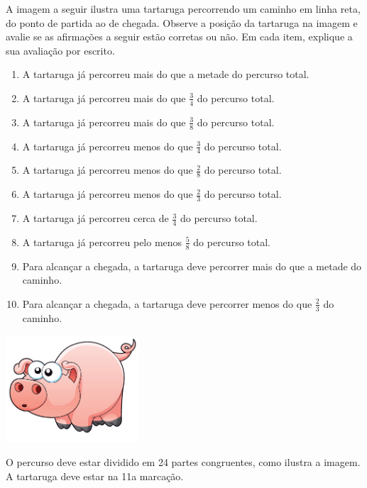 \documentclass[a4,12pt]{book}
\begin{document}
A imagem a seguir ilustra uma tartaruga percorrendo um caminho em linha reta, do ponto de partida ao de chegada. Observe a posição da tartaruga na imagem e avalie se as afirmações a seguir estão corretas ou não. Em cada item, explique a sua avaliação por escrito.
\begin{enumerate} [\quad a)] %
  \item     A tartaruga já percorreu mais do que a metade do percurso total.
  \item     A tartaruga já percorreu mais do que     $\frac{3}{4}$     do percurso total.
  \item     A tartaruga já percorreu mais do que     $\frac{3}{8}$     do percurso total.
  \item     A tartaruga já percorreu menos do que     $\frac{3}{4}$     do percurso total.
  \item     A tartaruga já percorreu menos do que     $\frac{2}{8}$     do percurso total.
  \item     A tartaruga já percorreu menos do que     $\frac{2}{3}$     do percurso total.
  \item     A tartaruga já percorreu cerca de     $\frac{3}{4}$     do percurso total.
  \item     A tartaruga já percorreu pelo menos     $\frac{5}{8}$     do percurso total.
  \item     Para alcançar a chegada, a tartaruga deve percorrer mais do que a metade do caminho.
  \item     Para alcançar a chegada, a tartaruga deve percorrer menos do que     $\frac{2}{3}$     do caminho.
\end{enumerate} %


\begin{imagem*}[breakable]{}{}

    \includegraphics[width=\textwidth,height=4cm, keepaspectratio]{pig}


  O percurso deve estar dividido em 24 partes congruentes, como ilustra a imagem. A tartaruga deve estar na 11a marcação.



\end{imagem*}
\end{document}
